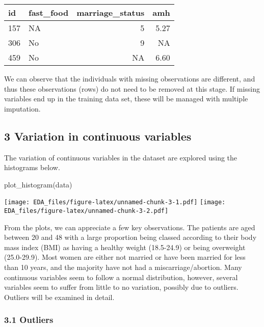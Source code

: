 \documentclass[
]{article}
\newenvironment{Shaded}{\begin{snugshade}}{\end{snugshade}}
\newcommand{\FunctionTok}[1]{\textcolor[rgb]{0.00,0.00,0.00}{#1}}
\newcommand{\NormalTok}[1]{#1}
\begin{document}
\begin{longtable}[]{@{}llrr@{}}
\toprule()
id & fast\_food & marriage\_status & amh \\
\midrule()
\endhead
157 & NA & 5 & 5.27 \\
306 & No & 9 & NA \\
459 & No & NA & 6.60 \\
\bottomrule()
\end{longtable}

We can observe that the individuals with missing observations are
different, and thus these observations (rows) do not need to be removed
at this stage. If missing variables end up in the training data set,
these will be managed with multiple imputation.

\hypertarget{variation-in-continuous-variables}{%
\subsection{3 Variation in continuous
variables}\label{variation-in-continuous-variables}}

The variation of continuous variables in the dataset are explored using
the histograms below.

\begin{Shaded}
\begin{Highlighting}[]
\FunctionTok{plot\_histogram}\NormalTok{(data)}
\end{Highlighting}
\end{Shaded}

\texttt{[image: EDA\_files/figure-latex/unnamed-chunk-3-1.pdf]}
\texttt{[image: EDA\_files/figure-latex/unnamed-chunk-3-2.pdf]}

From the plots, we can appreciate a few key observations. The patients
are aged between 20 and 48 with a large proportion being classed
according to their body mass index (BMI) as having a healthy weight
(18.5-24.9) or being overweight (25.0-29.9). Most women are either not
married or have been married for less than 10 years, and the majority
have not had a miscarriage/abortion. Many continuous variables seem to
follow a normal distribution, however, several variables seem to suffer
from little to no variation, possibly due to outliers. Outliers will be
examined in detail.

\hypertarget{outliers}{%
\subsubsection{3.1 Outliers}\label{outliers}}
\end{document}
